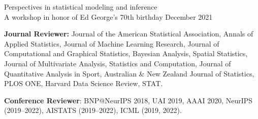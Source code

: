 \documentclass[margin]{res}
\begin{document}
\begin{resume}
Perspectives in statistical modeling and inference \\
A workshop in honor of Ed George's 70th birthday \hfill December 2021


\textbf{Journal Reviewer:} Journal of the American Statistical Association, Annals of Applied Statistics, Journal of Machine Learning Research, Journal of Computational and Graphical Statistics, Bayesian Analysis, Spatial Statistics, Journal of Multivariate Analysis, Statistics and Computation, Journal of Quantitative Analysis in Sport, Australian \& New Zealand Journal of Statistics, PLOS ONE, Harvard Data Science Review, STAT. 

\textbf{Conference Reviewer}: BNP@NeurIPS 2018, UAI 2019, AAAI 2020,  NeurIPS (2019--2022), AISTATS (2019--2022), ICML (2019, 2022).
\end{resume} 
\end{document}
